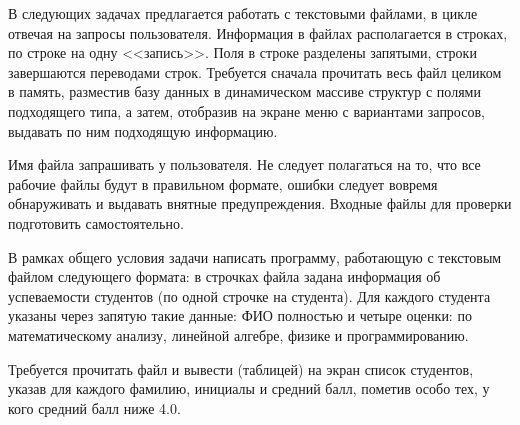 
В следующих задачах предлагается работать с текстовыми файлами, в цикле
отвечая на запросы пользователя. Информация в файлах располагается в строках,
по строке на одну <<запись>>. Поля в строке разделены запятыми, строки
завершаются переводами строк. Требуется сначала прочитать весь файл целиком в
память, разместив базу данных в динамическом массиве структур с полями
подходящего типа, а затем, отобразив на экране меню с вариантами запросов,
выдавать по ним подходящую информацию.

Имя файла запрашивать у пользователя. Не следует полагаться на то, что все
рабочие файлы будут в правильном формате, ошибки следует вовремя обнаруживать
и выдавать внятные предупреждения. Входные файлы для проверки подготовить
самостоятельно.


\begin{zztask}
В рамках общего условия задачи написать программу, работающую с текстовым файлом
следующего формата: в строчках файла задана информация 
об успеваемости студентов (по одной строчке на студента).
Для каждого студента указаны через запятую такие данные: ФИО полностью и четыре оценки:
по математическому анализу, линейной алгебре, физике и программированию.

Требуется прочитать файл и вывести (таблицей) на экран список студентов, указав для 
каждого фамилию, инициалы и средний балл, пометив особо тех, у кого средний балл ниже 4.0.
\end{zztask}


